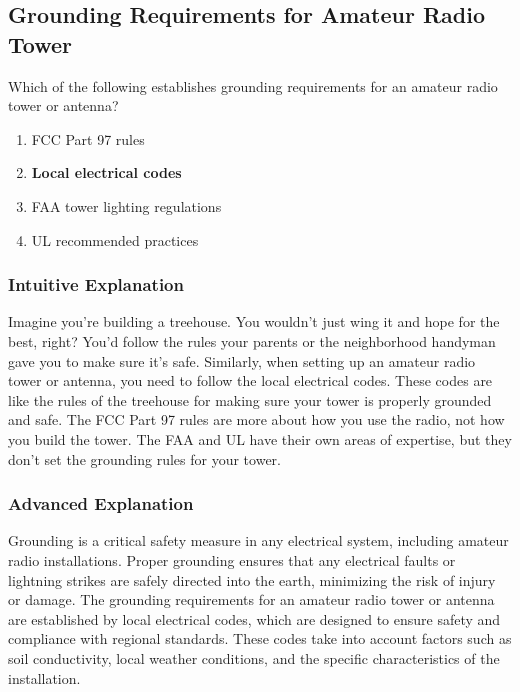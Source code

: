\subsection{Grounding Requirements for Amateur Radio Tower}
\label{T0B11}

\begin{tcolorbox}[colback=gray!10!white,colframe=black!75!black,title=T0B11]
Which of the following establishes grounding requirements for an amateur radio tower or antenna?
\begin{enumerate}[label=\Alph*)]
    \item FCC Part 97 rules
    \item \textbf{Local electrical codes}
    \item FAA tower lighting regulations
    \item UL recommended practices
\end{enumerate}
\end{tcolorbox}

\subsubsection{Intuitive Explanation}
Imagine you're building a treehouse. You wouldn't just wing it and hope for the best, right? You'd follow the rules your parents or the neighborhood handyman gave you to make sure it's safe. Similarly, when setting up an amateur radio tower or antenna, you need to follow the local electrical codes. These codes are like the rules of the treehouse for making sure your tower is properly grounded and safe. The FCC Part 97 rules are more about how you use the radio, not how you build the tower. The FAA and UL have their own areas of expertise, but they don't set the grounding rules for your tower.

\subsubsection{Advanced Explanation}
Grounding is a critical safety measure in any electrical system, including amateur radio installations. Proper grounding ensures that any electrical faults or lightning strikes are safely directed into the earth, minimizing the risk of injury or damage. The grounding requirements for an amateur radio tower or antenna are established by local electrical codes, which are designed to ensure safety and compliance with regional standards. These codes take into account factors such as soil conductivity, local weather conditions, and the specific characteristics of the installation.

